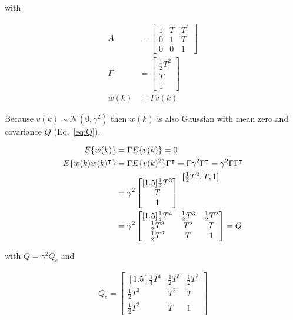 \documentclass[fleqn]{article}
\newenvironment{rowvector}
 {\bm{[}\begin{matrix}}
 {\end{matrix}\bm{]}}
\begin{document}
\noindent with 

\begin{align}
    A&=\begin{bmatrix}
          1 & T & T^2\\
          0 & 1 & T\\
          0 & 0 & 1
    \end{bmatrix}\label{eq:A}\\
    \Gamma&=\begin{bmatrix}
               \frac{1}{2}T^2\\
               T\\
               1
            \end{bmatrix}\nonumber\\
    w(k)&=\Gamma v(k)\nonumber
\end{align}

Because $v(k)\sim\mathcal{N}(0,\gamma^2)$ then $w(k)$ is also Gaussian with
mean zero and covariance $Q$ (Eq.~\ref{eq:Q}).

\begin{align}
    E\{w(k)\}&=\Gamma E\{v(k)\}=0\nonumber{}\\
    E\{w(k)w(k)^\intercal\}&=\Gamma E\{v(k)^2\}\Gamma^\intercal=\Gamma\gamma^2\Gamma^\intercal=\gamma^2\Gamma\Gamma^\intercal\nonumber\\
     &=\gamma^2\begin{bmatrix}[1.5]
         \frac{1}{2}T^2\\
         T\\
         1
       \end{bmatrix}
     \raisebox{4.5ex}{
         $\begin{rowvector}\frac{1}{2}T^2, T, 1\end{rowvector}$
     }\nonumber\\
     &=\gamma^2\begin{bmatrix}[1.5]
                   \frac{1}{4}T^4&\frac{1}{2}T^3&\frac{1}{2}T^2\\
                   \frac{1}{2}T^3&T^2&T\\
                   \frac{1}{2}T^2&T&1
     \end{bmatrix}=Q\label{eq:Q}
\end{align}

\noindent with $Q=\gamma^2Q_e$ and

\begin{align}
    Q_e=\begin{bmatrix}[1.5]
             \frac{1}{4}T^4&\frac{1}{2}T^3&\frac{1}{2}T^2\\
             \frac{1}{2}T^3&T^2&T\\
             \frac{1}{2}T^2&T&1
        \end{bmatrix}\label{eq:Qe}
\end{align}
\end{document}
